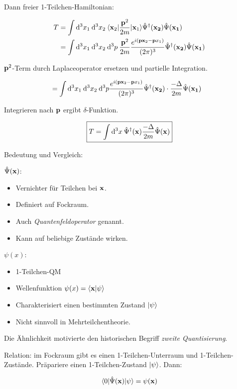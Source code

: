 \documentclass[11pt,a4paper]{report}
\begin{document}
Dann freier 1-Teilchen-Hamiltonian:

\begin{align*}
T&=\int\mathrm{d}^3x_1\:\mathrm{d}^3x_2\:\langle \mathbf{x}_2|\frac{\mathbf{p}^2}{2m}|\mathbf{x}_1\rangle\hat{\Psi}^\dagger (\mathbf{x_2})\hat{\Psi} (\mathbf{x_1}) \\
&= \int\mathrm{d}^3x_1\:\mathrm{d}^3x_2\:\mathrm{d}^3p\:\frac{\mathbf{p}^2}{2m}\frac{e^{i(\mathbf{p}\mathbf{x}_2-\mathbf{p}x_1)}}{(2\pi )^3}\hat{\Psi}^\dagger (\mathbf{x_2})\hat{\Psi} (\mathbf{x_1})
\end{align*}

$\mathbf{p}^2$-Term durch Laplaceoperator ersetzen und partielle Integration.

\begin{align*}
&= \int\mathrm{d}^3x_1\:\mathrm{d}^3x_2\:\mathrm{d}^3p \frac{e^{i(\mathbf{p}\mathbf{x}_2-\mathbf{p}x_1)}}{(2\pi )^3}\hat{\Psi}^\dagger (\mathbf{x_2})\cdot\frac{-\Delta}{2m}\hat{\Psi} (\mathbf{x_1})
\end{align*}

Integrieren nach $\mathbf{p}$ ergibt $\delta$-Funktion.

$$\boxed{T=\int\mathrm{d}^3x\:\hat{\Psi}^\dagger (\mathbf{x})\frac{-\Delta}{2m}\hat{\Psi} (\mathbf{x})}$$

Bedeutung und Vergleich:\par 

$\hat{\Psi} (\mathbf{x})$:
\begin{itemize}
\item Vernichter für Teilchen bei $\mathbf{x}$. 
\item Definiert auf Fockraum.
\item Auch \textit{Quantenfeldoperator} genannt.
\item Kann auf beliebige Zustände wirken.
\end{itemize}

$\psi (x)$:
\begin{itemize}
\item 1-Teilchen-QM
\item Wellenfunktion $\psi (x) = \langle \mathbf{x} | \psi \rangle$
\item Charakterisiert einen bestimmten Zustand $|\psi\rangle$
\item Nicht sinnvoll in Mehrteilchentheorie.
\end{itemize}

Die Ähnlichkeit motivierte den historischen Begriff \textit{zweite Quantisierung}.\par 

Relation: im Fockraum gibt es einen 1-Teilchen-Unterraum und 1-Teilchen-Zustände. Präpariere einen 1-Teilchen-Zustand $|\psi\rangle$. Dann:

$$\langle 0|\hat{\Psi} (\mathbf{x})|\psi\rangle = \psi (\mathbf{x})$$
\end{document}
